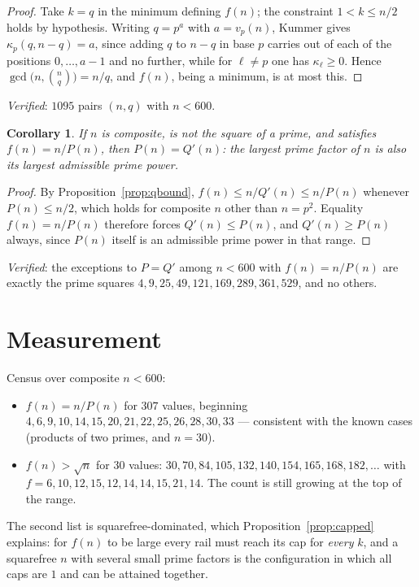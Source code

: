 \documentclass[11pt]{article}
\newtheorem{corollary}[theorem]{Corollary}
\begin{document}
\begin{proof}
Take $k=q$ in the minimum defining $f(n)$; the constraint $1<k\le n/2$ holds by hypothesis.
Writing $q=p^{a}$ with $a=v_p(n)$, Kummer gives $\kappa_p(q,n-q)=a$, since adding $q$ to
$n-q$ in base $p$ carries out of each of the positions $0,\dots,a-1$ and no further, while
for $\ell\ne p$ one has $\kappa_\ell\ge0$.  Hence
$\gcd\bigl(n,\binom nq\bigr)=n/q$, and $f(n)$, being a minimum, is at most this.
\end{proof}

\emph{Verified}: $1095$ pairs $(n,q)$ with $n<600$.

\begin{corollary}\label{cor:necessity}
If $n$ is composite, is not the square of a prime, and satisfies $f(n)=n/P(n)$, then
$P(n)=Q'(n)$: the largest prime factor of $n$ is also its largest admissible prime power.
\end{corollary}

\begin{proof}
By Proposition~\ref{prop:qbound}, $f(n)\le n/Q'(n)\le n/P(n)$ whenever $P(n)\le n/2$, which
holds for composite $n$ other than $n=p^{2}$.  Equality $f(n)=n/P(n)$ therefore forces
$Q'(n)\le P(n)$, and $Q'(n)\ge P(n)$ always, since $P(n)$ itself is an admissible prime
power in that range.
\end{proof}

\emph{Verified}: the exceptions to $P=Q'$ among $n<600$ with $f(n)=n/P(n)$ are exactly the
prime squares $4,9,25,49,121,169,289,361,529$, and no others.

\section{Measurement}
Census over composite $n<600$:
\begin{itemize}
\item $f(n)=n/P(n)$ for $307$ values, beginning
      $4,6,9,10,14,15,20,21,22,25,26,28,30,33$ --- consistent with the known cases
      (products of two primes, and $n=30$).
\item $f(n)>\sqrt n$ for $30$ values: $30,70,84,105,132,140,154,165,168,182,\dots$ with
      $f=6,10,12,15,12,14,14,15,21,14$.  The count is still growing at the top of the range.
\end{itemize}
The second list is squarefree-dominated, which Proposition~\ref{prop:capped} explains: for
$f(n)$ to be large every rail must reach its cap for \emph{every} $k$, and a squarefree $n$
with several small prime factors is the configuration in which all caps are $1$ and can be
attained together.
\end{document}
